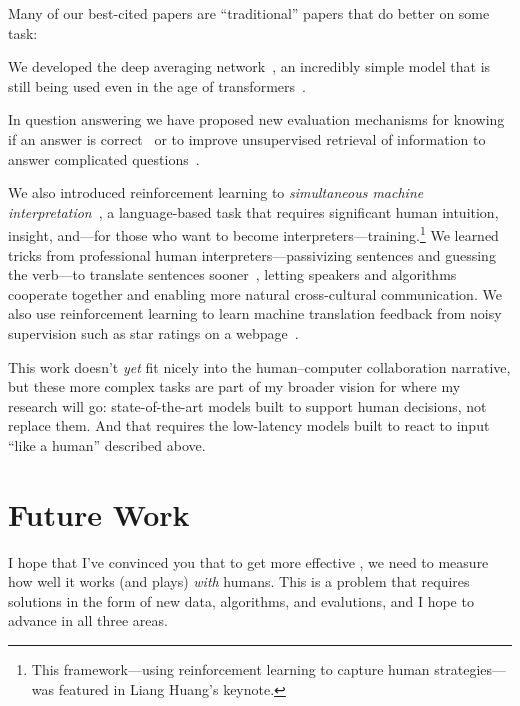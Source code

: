 Many of our best-cited papers are ``traditional'' papers that do
better on some task:
%
\begin{itemize*}
\item We developed the deep averaging network~\cite[]{iyyer-15}, an
incredibly simple model that is still being used even in the age of
transformers~\cite{ye-22}.

\item In question answering we have proposed new evaluation mechanisms
  for knowing if an answer is correct~\cite{si-21} or to improve
  unsupervised retrieval of information to answer complicated
  questions~\cite{elgohary-19,zhao-20,shi-20}.

\item We also introduced reinforcement learning to \emph{simultaneous
machine interpretation}~\cite{Grissom:He:Boyd-Graber:Morgan-2014}, a
  language-based task that requires significant human intuition,
  insight, and---for those who want to become
  interpreters---training.\footnote{This framework---using
  reinforcement learning to capture human strategies---was featured in
  Liang Huang's  keynote.} We learned tricks from
  professional human interpreters---passivizing sentences and guessing
  the verb---to translate sentences sooner~\cite{He-15}, letting
  speakers and algorithms cooperate together and enabling more natural
  cross-cultural communication.  We also use reinforcement
  learning to learn machine translation feedback from noisy
  supervision such as star ratings on a webpage~\cite{nguyen-17}.
\end{itemize*}

This work doesn't \emph{yet} fit nicely into the human--computer
collaboration narrative, but these more complex tasks are part of my
broader vision for where my research will go: state-of-the-art models
built to support human decisions, not replace them.  And that requires
the low-latency models built to react to input ``like a human''
described above.

\section{Future Work}

I hope that I've convinced you that to get more effective , we
need to measure how well it works (and plays) \emph{with} humans.
%
This is a problem that requires solutions in the form of new data, algorithms, and evalutions, and I
hope to advance in all three areas.

